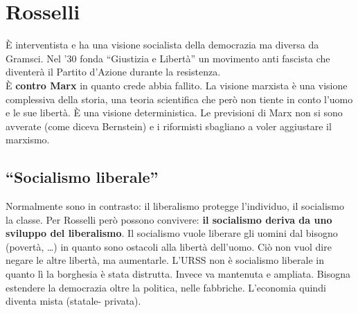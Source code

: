 
\section{Rosselli}
È interventista e ha una visione socialista della democrazia ma diversa da Gramsci. Nel '30 fonda
``Giustizia e Libertà'' un movimento anti fascista che diventerà il Partito d'Azione durante la 
resistenza.\\
È \textbf{contro Marx} in quanto crede abbia fallito. La visione marxista è una visione complessiva
della storia, una teoria scientifica che però non tiente in conto l'uomo e le sue libertà. È una 
visione deterministica. Le previsioni di Marx non si sono avverate (come diceva Bernstein) e i
riformisti sbagliano a voler aggiustare il marxismo.

\subsection{``Socialismo liberale''}
Normalmente sono in contrasto: il liberalismo protegge l'individuo, il socialismo la classe. Per 
Rosselli però possono convivere: \textbf{il socialismo deriva da uno sviluppo del liberalismo}. Il
socialismo vuole liberare gli uomini dal bisogno (povertà, \ldots) in quanto sono ostacoli alla
libertà dell'uomo. Ciò non vuol dire negare le altre libertà, ma aumentarle. L'URSS non è socialismo
liberale in quanto lì la borghesia è stata distrutta. Invece va mantenuta e ampliata. Bisogna 
estendere la democrazia oltre la politica, nelle fabbriche. L'economia quindi diventa mista (statale-
privata).
